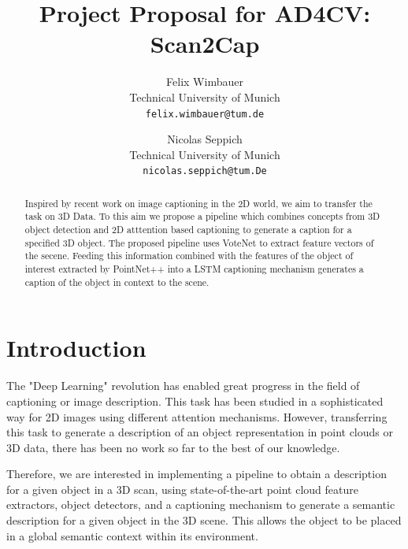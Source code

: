 \documentclass[10pt,twocolumn,letterpaper]{article}
\begin{document}
\title{Project Proposal for AD4CV: Scan2Cap}

\author{Felix Wimbauer\\
Technical University of Munich\\
{\tt\small felix.wimbauer@tum.de}
\and
Nicolas Seppich\\
Technical University of Munich\\
{\tt\small nicolas.seppich@tum.De}
}

\maketitle

\begin{abstract}
	Inspired by recent work on image captioning in the 2D world, we aim to transfer the task on 3D Data. To this aim we propose a pipeline which combines concepts from 3D object detection and 2D atttention based captioning to generate a caption for a specified 3D object. The proposed pipeline uses VoteNet to extract feature vectors of the secene. Feeding this information combined with the features of the object of interest extracted by PointNet++ into a LSTM captioning mechanism generates a caption of the object in context to the scene.  
   
\end{abstract}

\section{Introduction}

The "Deep Learning" revolution has enabled great progress in the field of captioning or image description. This task has been studied in a sophisticated way for 2D images using different attention mechanisms.
However, transferring this task to generate a description of an object representation in point clouds or 3D data, there has been no work so far to the best of our knowledge.

Therefore, we are interested in implementing a pipeline to obtain a description for a given object in a 3D scan, using state-of-the-art point cloud feature extractors, object detectors, and a captioning mechanism to generate a semantic description for a given object in the 3D scene. This allows the object to be placed in a global semantic context within its environment.
 
\end{document}
